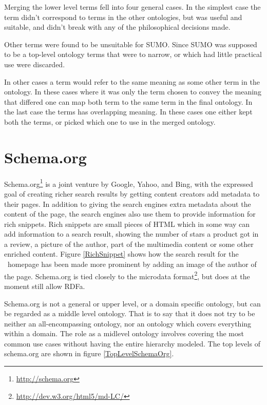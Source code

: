 Merging the lower level terms fell into four general cases.
In the simplest case the term didn't correspond to terms in the other ontologies,
but was useful and suitable, and didn't break with any of the philosophical decisions made.

Other terms were found to be unsuitable for SUMO.
Since SUMO was supposed to be a top-level ontology terms that were to narrow,
or which had little practical use were discarded.

In other cases a term would refer to the same meaning as some other term in the ontology.
In these cases where it was only the term chosen to convey the meaning that differed one can map both term to the same
term in the final ontology.
In the last case the terms has overlapping meaning.
In these cases one either kept both the terms, or picked which one to use in the merged ontology.


\section{Schema.org}
\label{schemadotorg}
Schema.org\footnote{\url{http://schema.org}} is a joint venture by Google, Yahoo, and Bing,
with the expressed goal of creating richer search results by getting content creators add metadata to their pages.
In addition to giving the search engines extra metadata about the content of the page,
the search engines also use them to provide information for rich snippets\citep{Guha2011}.
Rich snippets are small pieces of HTML which in some way can add information to a search result,
showing the number of stars a product got in a review, a picture of the author, part of the multimedia content
or some other enriched content\citep{Mayer2009}.
Figure \ref{RichSnippet} shows how the search result for the \theartefact\ homepage has been made more prominent by adding
an image of the author of the page.
Schema.org is tied closely to the microdata format\footnote{\url{http://dev.w3.org/html5/md-LC/}},
but does at the moment still allow RDFa.

Schema.org is not a general or upper level, or a domain specific ontology,
but can be regarded as a middle level ontology.
That is to say that it does not try to be neither an all-encompassing ontology,
nor an ontology which covers everything within a domain.
The role as a midlevel ontology involves covering the most common use cases without having the entire hierarchy modeled.
The top levels of schema.org are shown in figure \ref{TopLevelSchemaOrg}.

